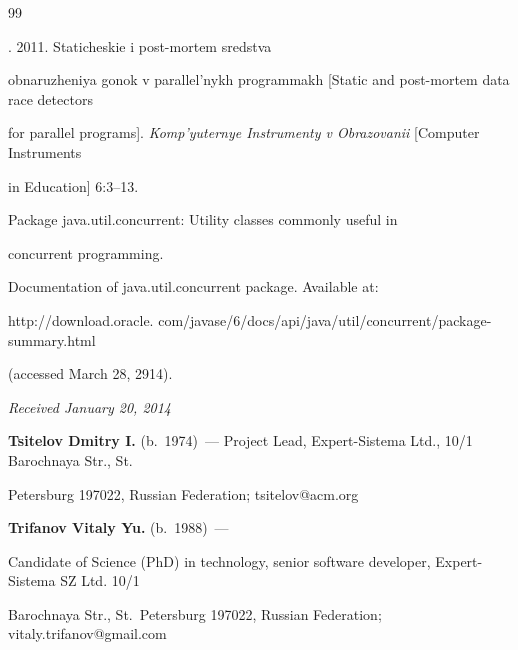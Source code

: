 {{\begin{thebibliography}{99}

. 2011. Staticheskie i post-mortem sredstva

obnaruzheniya gonok v parallel'nykh programmakh [Static and post-mortem data race detectors

for parallel programs]. \textit{Komp'yuternye Instrumenty v Obrazovanii} [Computer Instruments

in Education] 6:3--13.


Package java.util.concurrent: Utility classes commonly useful in

concurrent programming.

Documentation of java.util.concurrent package. Available at: {\sf

http://download.oracle. com/javase/6/docs/api/java/util/concurrent/package-summary.html}

(accessed March 28, 2914).







\end{thebibliography}

} }






\hfill{\small\textit{Received January 20, 2014}}








  \Contr



\noindent

\textbf{Tsitelov Dmitry I.} (b.\ 1974)~--- Project Lead, Expert-Sistema Ltd., 10/1 Barochnaya Str., St.\

Petersburg 197022, Russian Federation;  tsitelov@acm.org



\vspace*{3pt}



\noindent

\textbf{Trifanov Vitaly Yu.} (b.\ 1988)~---

Candidate of Science (PhD) in technology, senior software developer, Expert-Sistema SZ Ltd. 10/1

Barochnaya Str., St.\ Petersburg 197022, Russian Federation;  vitaly.trifanov@gmail.com



\label{end\stat}



\renewcommand{\bibname}{\protect\rmfamily Литература}

